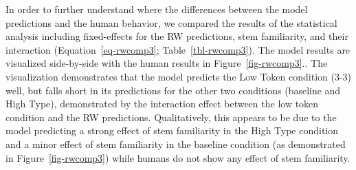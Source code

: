 \documentclass[
  letterpaper,
  DIV=11,
  numbers=noendperiod]{scrartcl}
\begin{document}
\begin{table}

\caption{\label{tbl-rwcomploocv}Results of the leave-one-out
cross-validation for the additional simulation. The results suggest that
the RW predictions capture the effect of stem familiarity (because
adding stem familiarity does not improve the model fit much) but the
model is not fully capturing the effect of condition (because adding
condition does improve the model fit).}


\end{table}%

In order to further understand where the differences between the model
predictions and the human behavior, we compared the results of the
statistical analysis including fixed-effects for the RW predictions,
stem familiarity, and their interaction (Equation~\ref{eq-rwcomp3};
Table~\ref{tbl-rwcomp3}). The model results are visualized side-by-side
with the human results in Figure~\ref{fig-rwcomp3}.. The visualization
demonstrates that the model predicts the Low Token condition (3-3) well,
but falls short in its predictions for the other two conditions
(baseline and High Type), demonstrated by the interaction effect between
the low token condition and the RW predictions. Qualitatively, this
appears to be due to the model predicting a strong effect of stem
familiarity in the High Type condition and a minor effect of stem
familiarity in the baseline condition (as demonstrated in
Figure~\ref{fig-rwcomp3}) while humans do not show any effect of stem
familiarity.
\end{document}
